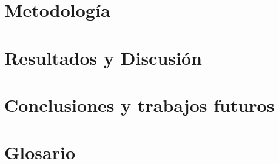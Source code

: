 \documentclass[12pt,a4paper]{article}
\begin{document}
\newpage

\section{Metodología}                                                         %













\newpage


\section{Resultados y Discusión}





\newpage
\section{Conclusiones y trabajos futuros}



\newpage
\section{Glosario}
\printnoidxglossaries
\newpage
\end{document}
